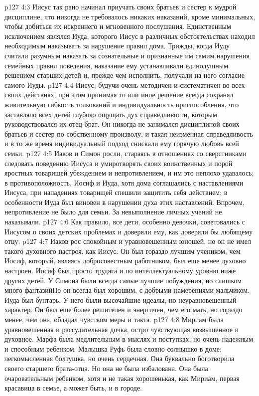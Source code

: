 \vs p127 4:3 Иисус так рано начинал приучать своих братьев и сестер к мудрой дисциплине, что никогда не требовалось никаких наказаний, кроме минимальных, чтобы добиться их искреннего и мгновенного послушания. Единственным исключением являлся Иуда, которого Иисус в различных обстоятельствах находил необходимым наказывать за нарушение правил дома. Трижды, когда Иуду считали разумным наказать за сознательные и признанные им самим нарушения семейных правил поведения, наказание ему устанавливали единодушным решением старших детей и, прежде чем исполнить, получали на него согласие самого Иуды.
\vs p127 4:4 Иисус, будучи очень методичен и систематичен во всех своих действиях, при этом принимая то или иное решение всегда сохранял живительную гибкость толкований и индивидуальность приспособления, что заставляло всех детей глубоко ощущать дух справедливости, которым руководствовался их отец\hyp{}брат. Он никогда не занимался дисциплиной своих братьев и сестер по собственному произволу, и такая неизменная справедливость и в то же время индивидуальный подход снискали ему горячую любовь всей семьи.
\vs p127 4:5 Иаков и Симон росли, стараясь в отношениях со сверстниками следовать поведению Иисуса и умиротворять своих воинственных и порой яростных товарищей убеждением и непротивлением, и им это неплохо удавалось; в противоположность, Иосиф и Иуда, хотя дома соглашались с наставлениями Иисуса, при нападениях товарищей спешили защитить себя действием; в особенности Иуда был виновен в нарушении духа этих наставлений. Впрочем, непротивление не было  для семьи. За невыполнение личных учений не наказывали.
\vs p127 4:6 Как правило, все дети, особенно девочки, советовались с Иисусом о своих детских проблемах и доверяли ему, как доверяли бы любящему отцу.
\vs p127 4:7 Иаков рос спокойным и уравновешенным юношей, но он не имел такого духовного настроя, как Иисус. Он был гораздо лучшим учеником, чем Иосиф, который, являясь добросовестным работником, был еще менее духовно настроен. Иосиф был просто трудяга и по интеллектуальному уровню ниже других детей. У Симона были всегда самые лучшие побуждения, но слишком много фантазийНо он всегда был хорошим, с добрыми намерениями мальчиком. Иуда был бунтарь. У него были высочайшие идеалы, но неуравновешенный характер. Он был еще более решителен и энергичен, чем его мать, но гораздо менее, чем она, обладал чувством меры и такта.
\vs p127 4:8 Мириам была уравновешенная и рассудительная дочка, остро чувствующая возвышенное и духовное. Марфа была медлительным в мыслях и поступках, но очень надежным и способным ребенком. Малышка Руфь была словно солнышко в доме; легкомысленная болтушка, но очень сердечная. Она буквально боготворила своего старшего брата\hyp{}отца. Но она не была избалована. Она была очаровательным ребенком, хотя и не такая хорошенькая, как Мириам, первая красавица в семье, а может быть, и в городе.
